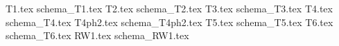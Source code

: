 \documentclass[spanish,a4paper,oneside]{article}
\begin{document}
{T1.tex}
{schema_T1.tex}
{T2.tex}
{schema_T2.tex}
{T3.tex}
{schema_T3.tex}
{T4.tex}
{schema_T4.tex}
{T4ph2.tex}
{schema_T4ph2.tex}
{T5.tex}
{schema_T5.tex}
{T6.tex}
{schema_T6.tex}
{RW1.tex}
{schema_RW1.tex}
\end{document}
